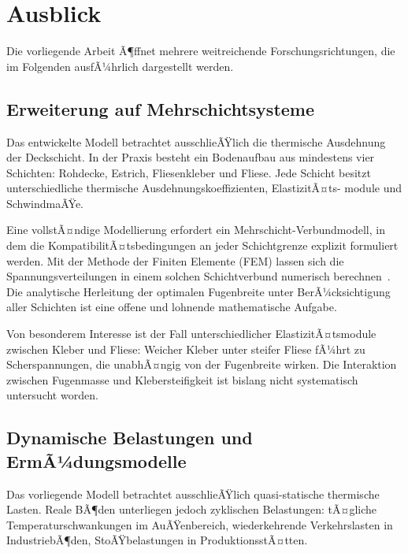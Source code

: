 ﻿\documentclass[a4paper,12pt]{article}
\theoremstyle{definition}
\begin{document}
\section{Ausblick}

Die vorliegende Arbeit Ã¶ffnet mehrere weitreichende Forschungsrichtungen,
die im Folgenden ausfÃ¼hrlich dargestellt werden.

\subsection{Erweiterung auf Mehrschichtsysteme}

Das entwickelte Modell betrachtet ausschlieÃŸlich die thermische Ausdehnung
der Deckschicht. In der Praxis besteht ein Bodenaufbau aus mindestens
vier Schichten: Rohdecke, Estrich, Fliesenkleber und Fliese. Jede Schicht
besitzt unterschiedliche thermische Ausdehnungskoeffizienten, ElastizitÃ¤ts-
module und SchwindmaÃŸe.

Eine vollstÃ¤ndige Modellierung erfordert ein Mehrschicht-Verbundmodell,
in dem die KompatibilitÃ¤tsbedingungen an jeder Schichtgrenze explizit
formuliert werden. Mit der Methode der Finiten Elemente (FEM) lassen
sich die Spannungsverteilungen in einem solchen Schichtverbund numerisch
berechnen~\cite{zienkiewicz2000}. Die analytische Herleitung der optimalen
Fugenbreite unter BerÃ¼cksichtigung aller Schichten ist eine offene
und lohnende mathematische Aufgabe.

Von besonderem Interesse ist der Fall unterschiedlicher ElastizitÃ¤tsmodule
zwischen Kleber und Fliese: Weicher Kleber unter steifer Fliese fÃ¼hrt zu
Scherspannungen, die unabhÃ¤ngig von der Fugenbreite wirken. Die Interaktion
zwischen Fugenmasse und Klebersteifigkeit ist bislang nicht systematisch
untersucht worden.

\subsection{Dynamische Belastungen und ErmÃ¼dungsmodelle}

Das vorliegende Modell betrachtet ausschlieÃŸlich quasi-statische thermische
Lasten. Reale BÃ¶den unterliegen jedoch zyklischen Belastungen:
tÃ¤gliche Temperaturschwankungen im AuÃŸenbereich, wiederkehrende
Verkehrslasten in IndustriebÃ¶den, StoÃŸbelastungen in ProduktionsstÃ¤tten.
\end{document}
